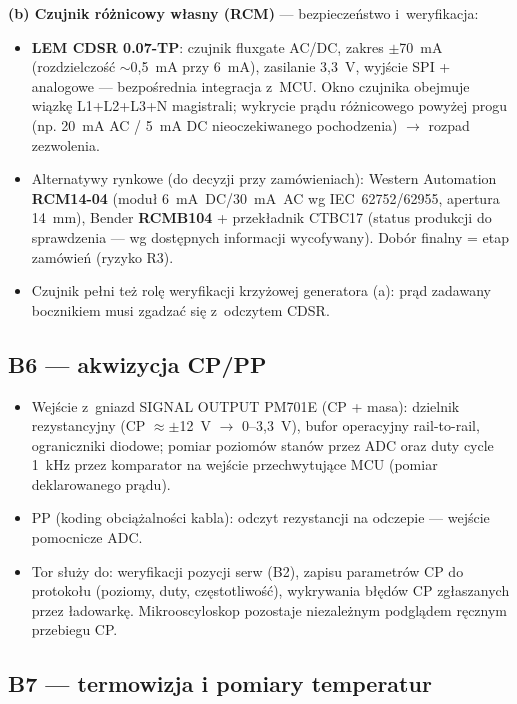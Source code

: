 \documentclass[11pt,a4paper]{article}
\begin{document}
\textbf{(b) Czujnik różnicowy własny (RCM)} --- bezpieczeństwo i~weryfikacja:
\begin{itemize}
\item \textbf{LEM CDSR 0.07-TP}: czujnik fluxgate AC/DC, zakres $\pm$70~mA (rozdzielczość $\sim$0,5~mA przy 6~mA), zasilanie 3,3~V, wyjście SPI + analogowe --- bezpośrednia integracja z~MCU. Okno czujnika obejmuje wiązkę L1+L2+L3+N magistrali; wykrycie prądu różnicowego powyżej progu (np. 20~mA AC / 5~mA DC nieoczekiwanego pochodzenia) $\rightarrow$ rozpad zezwolenia.
\item Alternatywy rynkowe (do decyzji przy zamówieniach): Western Automation \textbf{RCM14-04} (moduł 6~mA~DC/30~mA~AC wg IEC~62752/62955, apertura 14~mm), Bender \textbf{RCMB104} + przekładnik CTBC17 (status produkcji do sprawdzenia --- wg dostępnych informacji wycofywany). Dobór finalny = etap zamówień (ryzyko R3).
\item Czujnik pełni też rolę weryfikacji krzyżowej generatora (a): prąd zadawany bocznikiem musi zgadzać się z~odczytem CDSR.
\end{itemize}

\subsection{B6 --- akwizycja CP/PP}
\label{sec:b6}

\begin{itemize}
\item Wejście z~gniazd SIGNAL OUTPUT PM701E (CP + masa): dzielnik rezystancyjny (CP $\approx\pm$12~V $\rightarrow$ 0--3,3~V), bufor operacyjny rail-to-rail, ograniczniki diodowe; pomiar poziomów stanów przez ADC oraz duty cycle 1~kHz przez komparator na wejście przechwytujące MCU (pomiar deklarowanego prądu).
\item PP (koding obciążalności kabla): odczyt rezystancji na odczepie --- wejście pomocnicze ADC.
\item Tor służy do: weryfikacji pozycji serw (B2), zapisu parametrów CP do protokołu (poziomy, duty, częstotliwość), wykrywania błędów CP zgłaszanych przez ładowarkę. Mikrooscyloskop pozostaje niezależnym podglądem ręcznym przebiegu CP.
\end{itemize}

\subsection{B7 --- termowizja i pomiary temperatur}
\label{sec:b7}
\end{document}
